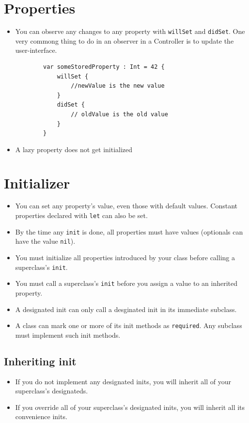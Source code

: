\documentclass[12pt]{report}
\newcommand{\co}{\texttt}
\begin{document}
\section{Properties}
\begin{itemize}
	\item You can observe any changes to any property with \co{willSet} and \co{didSet}. One very commong thing to do in an observer in a Controller is to update the user-interface.
	\begin{lstlisting}
		var someStoredProperty : Int = 42 {
			willSet { 
				//newValue is the new value
			}
			didSet {
				// oldValue is the old value
			}
		}
	\end{lstlisting}
	\item A lazy property does not get initialized
\end{itemize}

\section{Initializer}
\begin{itemize}
\item You can set any property's value, even those with default values. Constant properties declared with \co{let} can also be set.
\item By the time any \co{init} is done, all properties must have values (optionals can have the value \co{nil}).
\item You must initialize all properties introduced by your class before calling a superclass's \co{init}.
\item You must call a superclass's \co{init} before you assign a value to an inherited property.
\item A designated init can only call a desginated init in its immediate subclass.
\item A class can mark one or more of its init methods as \co{required}. Any subclass must implement such init methods.
\end{itemize}

\subsection{Inheriting init}
\begin{itemize}
	\item If you do not implement any designated inits, you will inherit all of your superclass's designateds.
	\item If you override all of your superclass's designated inits, you will inherit all its convenience inits.
\end{itemize}
\end{document}
